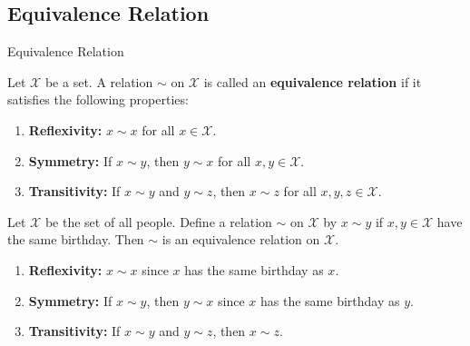 \documentclass[xcolor={usenames,dvipsnames}]{beamer}
\begin{document}
    \subsection{Equivalence Relation}
    \begin{frame}{Equivalence Relation}
        \begin{definition}
            Let $\mathcal{X}$ be a set. A relation $\sim$ on $\mathcal{X}$ is called an \textbf{equivalence relation} if it satisfies the following properties:
            \begin{enumerate}
                \item \textbf{Reflexivity:} $x \sim x$ for all $x \in \mathcal{X}$.
                \item \textbf{Symmetry:} If $x \sim y$, then $y \sim x$ for all $x,y \in \mathcal{X}$.
                \item \textbf{Transitivity:} If $x \sim y$ and $y \sim z$, then $x \sim z$ for all $x,y,z \in \mathcal{X}$.
            \end{enumerate}
        \end{definition}
        
        \begin{example}
            Let $\mathcal{X}$ be the set of all people. Define a relation $\sim$ on $\mathcal{X}$ by $x \sim y$ if $x,y \in \mathcal{X}$ have the same birthday. 
            Then $\sim$ is an equivalence relation on $\mathcal{X}$.
            \begin{enumerate}
                \item \textbf{Reflexivity:} $x \sim x$ since $x$ has the same birthday as $x$.
                \item \textbf{Symmetry:} If $x \sim y$, then $y \sim x$ since $x$ has the same birthday as $y$.
                \item \textbf{Transitivity:} If $x \sim y$ and $y \sim z$, then $x \sim z$.
            \end{enumerate}
        \end{example}
    \end{frame}
\end{document}
